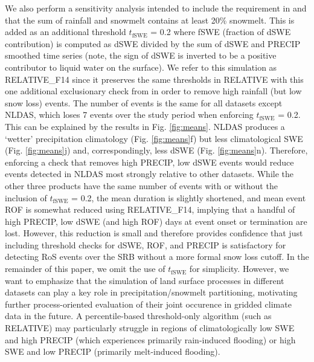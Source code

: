 \documentclass[nhess, manuscript]{copernicus}
\begin{document}
We also perform a sensitivity analysis intended to include the requirement in \citet{freudiger2014large} and \citet{musselman2018projected} that the sum of rainfall and snowmelt contains at least 20\% snowmelt.
This is added as an additional threshold $t_{\textrm{fSWE}}$ = 0.2 where fSWE (fraction of dSWE contribution) is computed as dSWE divided by the sum of dSWE and PRECIP smoothed time series (note, the sign of dSWE is inverted to be a positive contributor to liquid water on the surface).
We refer to this simulation as RELATIVE\_F14 since it preserves the same thresholds in RELATIVE with this one additional exclusionary check from \citet{freudiger2014large} in order to remove high rainfall (but low snow loss) events.
The number of events is the same for all datasets except NLDAS, which loses 7 events over the study period when enforcing $t_{\textrm{fSWE}}$ = 0.2.
This can be explained by the results in Fig. \ref{fig:means}. NLDAS produces a `wetter' precipitation climatology (Fig. \ref{fig:means}f) but less climatological SWE (Fig. \ref{fig:means}j) and, correspondingly, less dSWE (Fig. \ref{fig:means}n).
Therefore, enforcing a check that removes high PRECIP, low dSWE events would reduce events detected in NLDAS most strongly relative to other datasets.
While the other three products have the same number of events with or without the inclusion of $t_{\textrm{fSWE}}$ = 0.2, the mean duration is slightly shortened, and mean event ROF is somewhat reduced using RELATIVE\_F14, implying that a handful of high PRECIP, low dSWE (and high ROF) days at event onset or termination are lost.
However, this reduction is small and therefore provides confidence that just including threshold checks for dSWE, ROF, and PRECIP is satisfactory for detecting RoS events over the SRB without a more formal snow loss cutoff.
In the remainder of this paper, we omit the use of $t_{\textrm{fSWE}}$ for simplicity.
However, we want to emphasize that the simulation of land surface processes in different datasets can play a key role in precipitation/snowmelt partitioning, motivating further process-oriented evaluation of their joint occurence in gridded climate data in the future.
A percentile-based threshold-only algorithm (such as RELATIVE) may particularly struggle in regions of climatologically low SWE and high PRECIP (which experiences primarily rain-induced flooding) or high SWE and low PRECIP (primarily melt-induced flooding).
\end{document}
